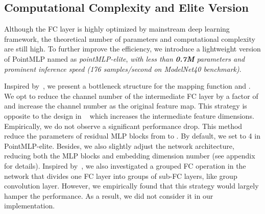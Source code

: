 \documentclass{article} \usepackage{iclr2022_conference,times}
\begin{document}
\subsection{Computational Complexity and Elite Version}
Although the FC layer is highly optimized by mainstream deep learning framework, the theoretical number of parameters and computational complexity are still high. To further improve the efficiency, we introduce a lightweight version of PointMLP named as \textit{pointMLP-elite}, \textit{with less than \textbf{0.7M} parameters and prominent inference speed (176 samples/second on ModelNet40 benchmark)}. 

Inspired by~\citet{he2016deep,hu2018squeeze}, we present a bottleneck structure for the mapping function  and . We opt to reduce the channel number of the intermediate FC layer by a factor of  and increase the channel number as the original feature map. This strategy is opposite to the design in ~\citet{vaswani2017attention,touvron2021resmlp} which increases the intermediate feature dimensions. Empirically, we do not observe a significant performance drop. This method reduce the parameters of residual MLP blocks from  to . By default, we set  to 4 in PointMLP-elite.
Besides, we also slightly adjust the network architecture, reducing both the MLP blocks and embedding dimension number (see appendix for details).
Inspired by~\citet{xie2017aggregated}, we also investigated a grouped FC operation in the network that divides one FC layer into  groups of sub-FC layers, like group convolution layer. However, we empirically found that this strategy would largely hamper the performance. As a result, we did not consider it in our implementation.
\end{document}
